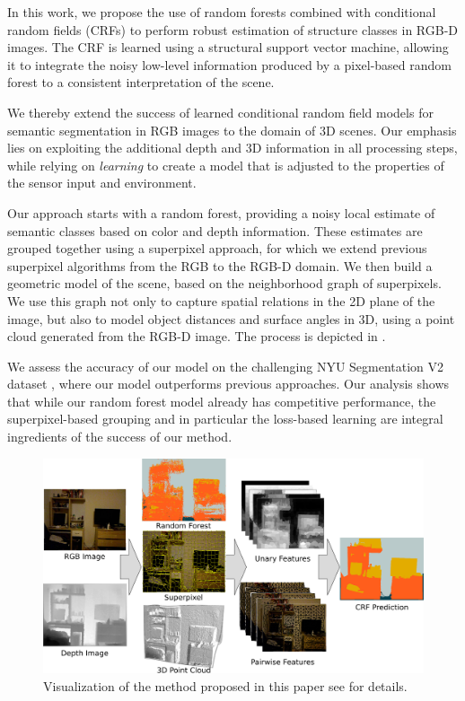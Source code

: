 \documentclass[a4paper, 10pt, conference]{ieeeconf}      %
\begin{document}
In this work, we propose the use of random forests combined with conditional
random fields (CRFs) to perform robust estimation of structure classes in RGB-D
images. The CRF is learned using a structural support vector machine,
allowing it to integrate the noisy low-level information produced by a pixel-based
random forest to a consistent interpretation of the scene.

We thereby extend the success of learned conditional random field models for
semantic segmentation in RGB images to the domain of 3D scenes.
Our emphasis lies on exploiting the additional depth and 3D information in all
processing steps, while relying on \emph{learning} to create a model that 
is adjusted to the properties of the sensor input and environment.

Our approach starts with a random forest, providing a noisy local estimate
of semantic classes based on color and depth information. These estimates
are grouped together using a superpixel approach, for which we extend previous
superpixel algorithms from the RGB to the RGB-D domain.
We then build a geometric model of the scene, based on the neighborhood graph
of superpixels.  We use this graph not only to capture spatial relations in the
2D plane of the image, but also to model object distances and surface angles in
3D, using a point cloud generated from the RGB-D image. The process is depicted
in .

We assess the accuracy of our model on the challenging NYU Segmentation V2
dataset \citep{SilbermanECCV12}, where our model outperforms previous
approaches.  Our analysis shows that while our random forest model
already has competitive performance, the superpixel-based grouping and in
particular the loss-based learning are integral ingredients of the success of our method.

\begin{figure}
    \begin{center}
        \includegraphics[width=\linewidth]{images/teaser}
    \end{center}
    \caption{%
        Visualization of the method proposed in this paper see  for details.\label{teaser}
    }
\end{figure}
\end{document}
